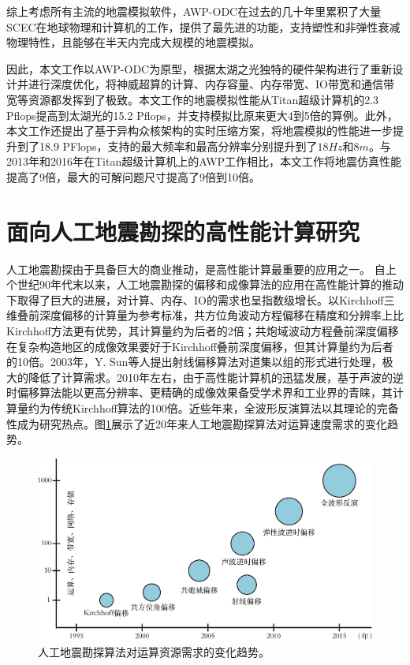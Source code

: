 \documentclass[degree=doctor]{thuthesis}
\begin{document}
综上考虑所有主流的地震模拟软件，AWP-ODC在过去的几十年里累积了大量SCEC在地球物理和计算机的工作，提供了最先进的功能，支持塑性和非弹性衰减物理特性，且能够在半天内完成大规模的地震模拟。

因此，本文工作以AWP-ODC为原型，根据太湖之光独特的硬件架构进行了重新设计并进行深度优化，将神威超算的计算、内存容量、内存带宽、IO带宽和通信带宽等资源都发挥到了极致。本文工作的地震模拟性能从Titan超级计算机的2.3 Pflops提高到太湖光的15.2 Pflops，并支持模拟比原来更大4到5倍的算例。此外，本文工作还提出了基于异构众核架构的实时压缩方案，将地震模拟的性能进一步提升到了18.9 PFlops，支持的最大频率和最高分辨率分别提升到了$18Hz$和$8m$。与2013年和2016年在Titan超级计算机上的AWP工作相比，本文工作将地震仿真性能提高了9倍，最大的可解问题尺寸提高了9倍到10倍。



\section{面向人工地震勘探的高性能计算研究}

人工地震勘探由于具备巨大的商业推动，是高性能计算最重要的应用之一。
自上个世纪90年代末以来，人工地震勘探的偏移和成像算法的应用在高性能计算的推动下取得了巨大的进展，对计算、内存、IO的需求也呈指数级增长。以Kirchhoff三维叠前深度偏移\cite{yilmaz2001seismic}的计算量为参考标准，共方位角波动方程偏移\cite{rickett2002offset}在精度和分辨率上比Kirchhoff方法更有优势，其计算量约为后者的2倍；共炮域波动方程叠前深度偏移\cite{zhang2005theory}在复杂构造地区的成像效果要好于Kirchhoff叠前深度偏移，但其计算量约为后者的10倍。2003年，Y. Sun等人提出射线偏移算法\cite{sun20003}对道集以组的形式进行处理，极大的降低了计算需求。2010年左右，由于高性能计算机的迅猛发展，基于声波的逆时偏移算法\cite{baysal1983reverse}能以更高分辨率、更精确的成像效果备受学术界和工业界的青睐，其计算量约为传统Kirchhoff算法的100倍。近些年来，全波形反演算法\cite{tarantola1984inversion}以其理论的完备性成为研究热点。图\ref{fig:seismicmethod}展示了近20年来人工地震勘探算法对运算速度需求的变化趋势。

\begin{figure}[ht]
\centering
\includegraphics[width=0.7\columnwidth]{地震勘探算法与资源需求-crop.pdf}
\caption{人工地震勘探算法对运算资源需求的变化趋势。}
\label{fig:seismicmethod}
\end{figure}
\end{document}
